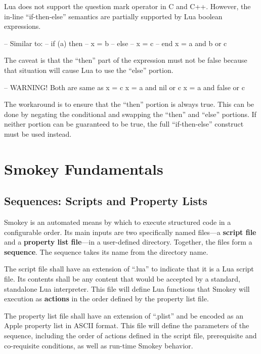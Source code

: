 \documentclass[11pt]{article}
\newcommand{\jargon}[1]{{\bfseries#1}}
\begin{document}
Lua does not support the question mark operator in C and C++.  However, the
in-line ``if-then-else'' semantics are partially supported by Lua boolean
expressions.

\begin{LuaCode}
-- Similar to:
--	if (a) then
--		x = b
--	else
--		x = c
--	end
x = a and b or c
\end{LuaCode}

The caveat is that the ``then'' part of the expression must not be false because
that situation will cause Lua to use the ``else'' portion.

\begin{LuaCode}
-- WARNING!  Both are same as x = c
x = a and nil or c
x = a and false or c
\end{LuaCode}

The workaround is to ensure that the ``then'' portion is always true.  This can
be done by negating the conditional and swapping the ``then'' and ``else''
portions.  If neither portion can be guaranteed to be true, the full
``if-then-else'' construct must be used instead.

\section{Smokey Fundamentals}

\subsection{Sequences: Scripts and Property Lists}

Smokey is an automated means by which to execute structured code in a
configurable order.  Its main inputs are two specifically named files---a \jargon{script
file} and a \jargon{property list file}---in a user-defined directory.  Together, the files
form a \jargon{sequence}.  The sequence takes its name from the directory name.

The script file shall have an extension of ``.lua'' to indicate that it is a Lua
script file.  Its contents shall be any content that would be accepted by a
standard, standalone Lua interpreter.  This file will define Lua functions that
Smokey will execution as \jargon{actions} in the order defined by the property list
file.

The property list file shall have an extension of ``.plist'' and be encoded as an
Apple property list in ASCII format.  This file will define the parameters of
the sequence, including the order of actions defined in the script file,
prerequisite and co-requisite conditions, as well as run-time Smokey behavior.
\end{document}
